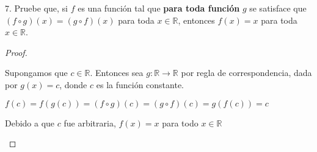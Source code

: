 \documentclass[11pt, a4paper]{article}
\begin{document}
    7. Pruebe que, si $f$ es una función tal que \textbf{para toda función} $g$ se satisface que $(f \circ g)(x) = (g \circ f)(x)$
    para toda $x \in \mathbb{R}$, entonces $f(x) = x$ para toda $x \in \mathbb{R}$.
    \begin{proof}
        \begin{center}
            Supongamos que $c \in \mathbb{R}$. Entonces sea $g: \mathbb{R} \rightarrow \mathbb{R}$ por regla
            de correspondencia, dada por $g(x)=c$, donde $c$ es la función constante.

            $f(c)= f(g(c))=(f\circ g)(c)=(g\circ f)(c)=g(f(c))=c$

            Debido a que $c$ fue arbitraria, $f(x)=x$ para todo $x\in \mathbb{R}$
        \end{center}
    \end{proof}
\end{document}
